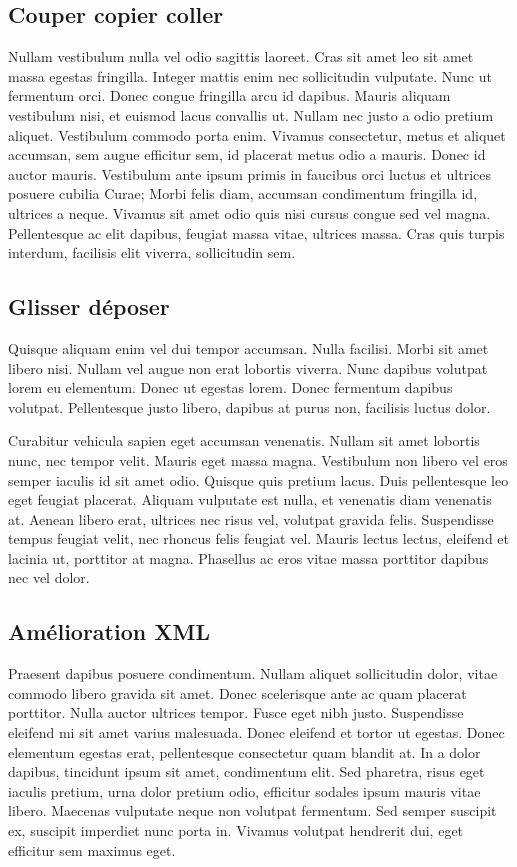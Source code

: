 	\subsection{Couper copier coller}
		Nullam vestibulum nulla vel odio sagittis laoreet. Cras sit amet leo sit amet massa egestas fringilla. Integer mattis enim nec sollicitudin vulputate. Nunc ut fermentum orci. Donec congue fringilla arcu id dapibus. Mauris aliquam vestibulum nisi, et euismod lacus convallis ut. Nullam nec justo a odio pretium aliquet. Vestibulum commodo porta enim. Vivamus consectetur, metus et aliquet accumsan, sem augue efficitur sem, id placerat metus odio a mauris. Donec id auctor mauris. Vestibulum ante ipsum primis in faucibus orci luctus et ultrices posuere cubilia Curae; Morbi felis diam, accumsan condimentum fringilla id, ultrices a neque. Vivamus sit amet odio quis nisi cursus congue sed vel magna. Pellentesque ac elit dapibus, feugiat massa vitae, ultrices massa. Cras quis turpis interdum, facilisis elit viverra, sollicitudin sem. 

	\subsection{Glisser déposer}
		Quisque aliquam enim vel dui tempor accumsan. Nulla facilisi. Morbi sit amet libero nisi. Nullam vel augue non erat lobortis viverra. Nunc dapibus volutpat lorem eu elementum. Donec ut egestas lorem. Donec fermentum dapibus volutpat. Pellentesque justo libero, dapibus at purus non, facilisis luctus dolor.

		Curabitur vehicula sapien eget accumsan venenatis. Nullam sit amet lobortis nunc, nec tempor velit. Mauris eget massa magna. Vestibulum non libero vel eros semper iaculis id sit amet odio. Quisque quis pretium lacus. Duis pellentesque leo eget feugiat placerat. Aliquam vulputate est nulla, et venenatis diam venenatis at. Aenean libero erat, ultrices nec risus vel, volutpat gravida felis. Suspendisse tempus feugiat velit, nec rhoncus felis feugiat vel. Mauris lectus lectus, eleifend et lacinia ut, porttitor at magna. Phasellus ac eros vitae massa porttitor dapibus nec vel dolor. 

	\subsection{Amélioration XML}
		Praesent dapibus posuere condimentum. Nullam aliquet sollicitudin dolor, vitae commodo libero gravida sit amet. Donec scelerisque ante ac quam placerat porttitor. Nulla auctor ultrices tempor. Fusce eget nibh justo. Suspendisse eleifend mi sit amet varius malesuada. Donec eleifend et tortor ut egestas. Donec elementum egestas erat, pellentesque consectetur quam blandit at. In a dolor dapibus, tincidunt ipsum sit amet, condimentum elit. Sed pharetra, risus eget iaculis pretium, urna dolor pretium odio, efficitur sodales ipsum mauris vitae libero. Maecenas vulputate neque non volutpat fermentum. Sed semper suscipit ex, suscipit imperdiet nunc porta in. Vivamus volutpat hendrerit dui, eget efficitur sem maximus eget.


